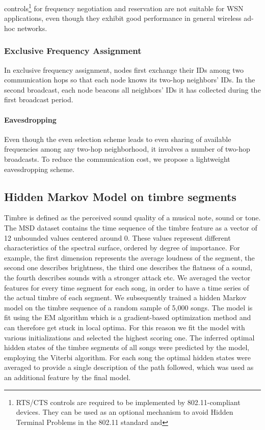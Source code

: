 \documentclass[acmtog, authorversion]{acmart}
\begin{document}
controls\footnote{RTS/CTS controls are required to be implemented by
802.11-compliant devices. They can be used as an optional mechanism
to avoid Hidden Terminal Problems in the 802.11 standard and}
for frequency negotiation and reservation are not
suitable for WSN applications, even though they exhibit good
performance in general wireless ad-hoc
networks.

\subsubsection{Exclusive Frequency Assignment}


In exclusive frequency assignment, nodes first exchange their IDs
among two communication hops so that each node knows its two-hop
neighbors' IDs. In the second broadcast, each node beacons all
neighbors' IDs it has collected during the first broadcast period.

\paragraph{Eavesdropping}

Even though the even selection scheme leads to even sharing of
available frequencies among any two-hop neighborhood, it involves a
number of two-hop broadcasts. To reduce the communication cost, we
propose a lightweight eavesdropping scheme.

\subsection{Hidden Markov Model on timbre segments}

Timbre is defined as the perceived sound quality of a musical note, sound or tone. The MSD dataset contains the time sequence of the timbre feature as a vector of 12 unbounded values centered around 0. These values represent different characteristics of the spectral
surface, ordered by degree of importance. For example, the first dimension represents the average
loudness of the segment, the second one describes brightness, the third one describes the flatness of a sound, the fourth describes sounds with a stronger attack etc. We averaged the vector features for every time segment for each song, in order to have a time series of the actual timbre of each segment.
We subsequently trained a hidden Markov model on the timbre sequence of a random sample of 5,000 songs. The model is fit using the EM algorithm which is a gradient-based optimization method and can therefore get stuck in local optima. For this reason we fit the model with various initializations and selected the highest scoring one.
The inferred optimal hidden states of the timbre segments of all songs were predicted by the model, employing the Viterbi algorithm.
For each song the optimal hidden states were averaged to provide a single description of the path followed, which was used as an additional feature by the final model.
\end{document}
